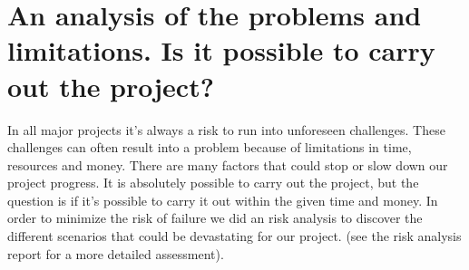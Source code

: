 \section{An analysis of the problems and limitations. Is it possible to carry out the project?}

In all major projects it's always a risk to run into unforeseen challenges. These challenges can often result into a problem because of limitations in time, resources and money.
There are many factors that could stop or slow down our project progress. It is absolutely possible to carry out the project, but the question is if it's possible to carry it out within the given time and money. In order to minimize the risk of failure we did an risk analysis to discover the different scenarios that could be devastating for our project. (see the risk analysis report for a more detailed assessment). 